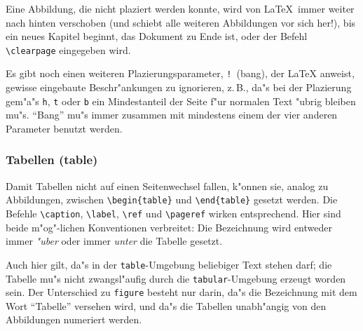 Eine Abbildung, die nicht plaziert werden konnte, wird von
\LaTeX\ immer weiter nach hinten verschoben (und schiebt alle
weiteren Abbildungen vor sich her!), bis ein neues Kapitel
beginnt, das Dokument zu Ende ist, oder der Befehl
\verb|\clearpage| eingegeben wird.  


Es gibt noch einen weiteren Plazierungsparameter, 
\texttt{!}\ (bang), der \LaTeX{} anweist, 
gewisse eingebaute Beschr"ankungen zu ignorieren, 
z.\,B., da"s bei der Plazierung gem"a"s \texttt{h}, \texttt{t} oder \texttt{b}
ein Mindestanteil der Seite f"ur normalen Text "ubrig bleiben mu"s.
"`Bang"' mu"s immer zusammen mit mindestens einem der vier
anderen Parameter benutzt werden.  
 


\subsubsection{Tabellen (table)}

\begin{sloppypar}
\relax %

Damit Tabellen nicht auf einen Seitenwechsel fallen,
k"onnen sie, analog zu Abbildungen, zwischen
\verb|\begin{table}| und \verb|\end{table}| gesetzt werden.
Die Befehle
\verb|\caption|, \verb|\label|, \verb|\ref| und \verb|\pageref|
wirken entsprechend.
Hier sind beide m"og"-lichen Konventionen verbreitet: Die
Bezeichnung wird entweder immer \emph{"uber} oder immer
\emph{unter} die Tabelle gesetzt.
\end{sloppypar}

Auch hier gilt, da"s in der \texttt{table}-Umgebung  beliebiger
Text stehen darf; die Tabelle mu"s nicht zwangsl"aufig durch die
\texttt{tabular}-Umgebung erzeugt worden sein.
Der Unterschied zu \texttt{figure} besteht nur darin, 
da"s die Bezeichnung mit dem Wort "`Tabelle"' versehen wird,
und da"s die Tabellen unabh"angig von den Abbildungen numeriert werden.

\endinput
